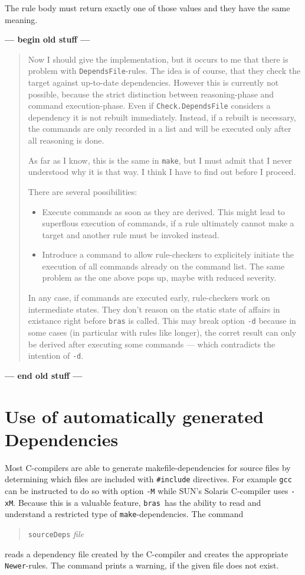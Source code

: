 \documentclass[12pt]{article}
\newcommand{\bras}{\texttt{bras}}
\newcommand{\make}{\texttt{make}}
\begin{document}
The rule body must return exactly one of those values and they have
the same meaning.

{\large\bfseries --- begin old stuff ---}
\begin{quote}\sffamily
Now I should give the implementation, but it occurs to me that there
is problem with \texttt{DependsFile}-rules. The idea is of course, that
they check the target against up-to-date dependencies. However this is
currently not possible, because the strict distinction between
reasoning-phase and command execution-phase. Even if
\texttt{Check.DependsFile} considers a dependency it is not rebuilt
immediately. Instead, if a rebuilt is necessary, the commands are only
recorded in a list and will be executed only after all reasoning is
done.

As far as I know, this is the same in \make{}, but I must admit that I
never understood why it is that way. I think I have to find out before
I proceed.

There are several possibilities:
\begin{itemize}
\item
Execute commands as soon as they are derived. This might lead to
superflous execution of commands, if a rule ultimately cannot make a
target and another rule must be invoked instead.
\item 
Introduce a command to allow rule-checkers to explicitely initiate the
execution of all commands already on the command list. The same
problem as the one above pops up, maybe with reduced severity.
\end{itemize}

In any case, if commands are executed early, rule-checkers work on
intermediate states. They don't reason on the static state of affairs
in existance right before \bras{} is called. This may break
option \texttt{-d} because in some cases (in particular with rules
like longer), the corret result can only be derived after executing
some commands --- which contradicts the intention of \texttt{-d}.
\end{quote}

{\large\bfseries --- end old stuff ---}


\section{Use of automatically generated Dependencies}

Most C-compilers are able to generate makefile-dependencies for
source files by determining which files are included with
\texttt{\#include} directives. For example \texttt{gcc} can be
instructed to do so with option \texttt{-M} while SUN's Solaris
C-compiler uses \texttt{-xM}. Because this is a valuable feature,
\bras\ has the ability to read and understand a restricted type of
\make-dependencies. The command
\begin{quote}
  \texttt{sourceDeps} \textit{file}
\end{quote}
reads a dependency file created by the C-compiler and creates the
appropriate \texttt{Newer}-rules. The command prints a warning, if
the given file does not exist.
   
\end{document}
